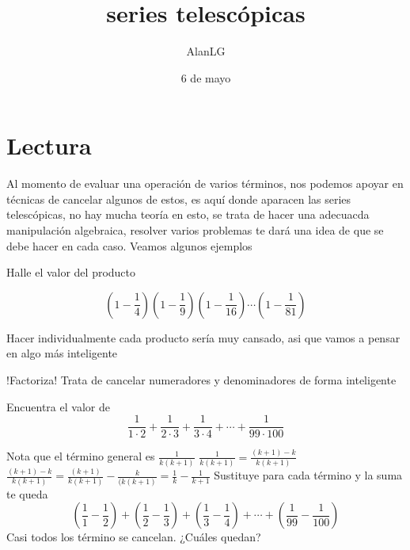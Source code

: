 \documentclass[11pt]{scrartcl}
\title{series telescópicas}
\author{AlanLG}
\date{6 de mayo}
\begin{document}
\maketitle

\section{Lectura}
Al momento de evaluar una operación de varios términos, nos podemos apoyar en técnicas de cancelar algunos de estos, es aquí donde aparacen las series telescópicas, no hay mucha teoría en esto, se trata de hacer una adecuacda manipulación algebraica, resolver varios problemas te dará una idea de que se debe hacer en cada caso. Veamos algunos ejemplos

\begin{example}
    Halle el valor del producto

$$\left(1-\frac{1}{4}\right)\left(1-\frac{1}{9}\right)\left(1-\frac{1}{16}\right)\cdots\left(1-\frac{1}{81}\right)$$

\end{example}

\begin{walkthrough} 
 Hacer individualmente cada producto sería muy cansado, asi que vamos a pensar en algo más inteligente
 \begin{walk}
    \ii  !Factoriza!  
    \ii Trata de cancelar numeradores y denominadores de forma inteligente
\end{walk}
\end{walkthrough}

\begin{example}
    Encuentra el valor de 
    \[\frac{1}{1\cdot 2}+\frac{1}{2\cdot 3}+\frac{1}{3\cdot 4}+\cdots+\frac{1}{99\cdot 100}\]
  
\end{example}

\begin{walkthrough}
    \begin{walk}
        \ii Nota que el término general es $\frac{1}{k(k+1)}$
        \ii $\frac{1}{k(k+1)}=\frac{(k+1)-k}{k(k+1)}$
        \ii $\frac{(k+1)-k}{k(k+1)}=\frac{(k+1)}{k(k+1)}-\frac{k}{(k(k+1)}=\frac{1}{k}-\frac{1}{k+1}$
        \ii Sustituye para cada término y la suma te queda
        \[\left(\frac{1}{1}-\frac{1}{2}\right)+\left(\frac{1}{2}-\frac{1}{3}\right)+\left(\frac{1}{3}-\frac{1}{4}\right)+\cdots+\left(\frac{1}{99}-\frac{1}{100}\right)\]
        \ii Casi todos los término se cancelan. ¿Cuáles quedan?
    \end{walk}
\end{walkthrough}
\end{document}
